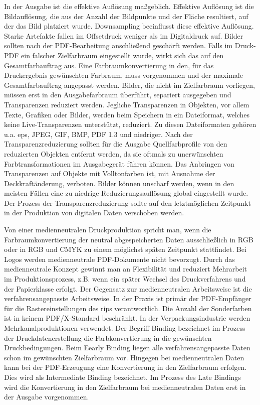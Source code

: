 In der Ausgabe ist die effektive Auflösung maßgeblich. Effektive Auflösung ist die Bildauflösung, die aus der Anzahl der Bildpunkte und der Fläche resultiert, auf der das Bild platziert wurde. Downsampling beeinflusst diese effektive Auflösung. Starke Artefakte fallen im Offsetdruck weniger als im Digitaldruck auf. Bilder sollten nach der PDF-Bearbeitung anschließend geschärft werden. Falls im Druck-PDF ein falscher Zielfarbraum eingestellt wurde, wirkt sich das auf den Gesamtfarbauftrag aus. Eine Farbraumkonvertierung in den, für das Druckergebnis gewünschten Farbraum, muss vorgenommen und der maximale Gesamtfarbauftrag angepasst werden. Bilder, die nicht im Zielfarbraum vorliegen, müssen erst in den Ausgabefarbraum überführt, separiert ausgegeben und Transparenzen reduziert werden. Jegliche Transparenzen in Objekten, vor allem Texte, Grafiken oder Bilder, werden beim Speichern in ein Dateiformat, welches keine Live-Transparenzen unterstützt, reduziert. Zu diesen Dateiformaten gehören u.a. \gls{eps}, JPEG, GIF, BMP, PDF 1.3 und niedriger. Nach der Transparenzreduzierung sollten für die Ausgabe Quellfarbprofile von den reduzierten Objekten entfernt werden, da sie oftmals zu unerwünschten Farbtransformationen im Ausgabegerät führen können. Das Anbringen von Transparenzen auf Objekte mit Volltonfarben ist, mit Ausnahme der Deckkraftänderung, verboten. Bilder können unscharf werden, wenn in den meisten Fällen eine zu niedrige Reduzierungsauflösung global eingestellt wurde. Der Prozess der Transparenzreduzierung sollte auf den letztmöglichen Zeitpunkt in der Produktion von digitalen Daten verschoben werden.
\par
Von einer medienneutralen Druckproduktion spricht man, wenn die Farbraumkonvertierung der neutral abgespeicherten Daten ausschließlich in RGB oder in RGB und CMYK zu einem möglichst späten Zeitpunkt stattfindet. Bei Logos werden medienneutrale PDF-Dokumente nicht bevorzugt. Durch das medienneutrale Konzept gewinnt man an Flexibilität und reduziert Mehrarbeit im Produktionsprozess, z.B. wenn ein später Wechsel des Druckverfahrens und der Papierklasse erfolgt. Der Gegensatz zur medienneutralen Arbeitsweise ist die verfahrensangepasste Arbeitsweise. In der Praxis ist primär der PDF-Empfänger für die Rastereinstellungen des \gls{rip}s verantwortlich. Die Anzahl der Sonderfarben ist in keinem PDF/X-Standard beschränkt. In der Verpackungsindustrie werden Mehrkanalproduktionen verwendet. Der Begriff Binding bezeichnet im Prozess der Druckdatenerstellung die Farbkonvertierung in die gewünschten Druckbedingungen. Beim Eearly Binding liegen alle verfahrensangepasste Daten schon im gewünschten Zielfarbraum vor. Hingegen bei medienneutralen Daten kann bei der PDF-Erzeugung eine Konvertierung in den Zielfarbraum erfolgen. Dies wird als Intermediate Binding bezeichnet. Im Prozess des Late Bindings wird die Konvertierung in den Zielfarbraum bei medienneutralen Daten erst in der Ausgabe vorgenommen. \\
